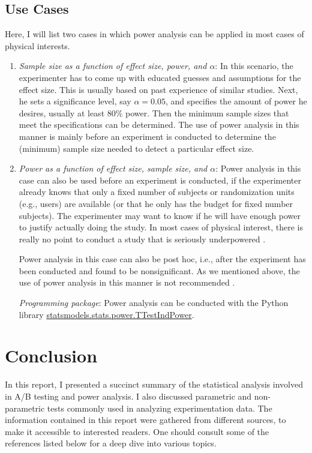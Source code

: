\documentclass[10pt, aps,twocolumn, superscriptaddress, nofootinbib]{revtex4-2}
\begin{document}
\subsection{Use Cases}
Here, I will list two cases in which power analysis can be applied in most cases of physical interests.
 \begin{enumerate}
\item \textit{Sample size as a function of effect size, power, and $\alpha$}: In this scenario, the experimenter has to come up with educated guesses and assumptions for the effect size. This is usually based on past experience of similar studies. Next, he sets a significance level, say $\alpha =0.05$, and specifies the amount of power he desires, usually at least $80\%$ power. Then the minimum sample sizes that meet the specifications can be determined. The use of power analysis in this manner is mainly before an experiment is conducted to determine the (minimum) sample size needed to detect a particular effect size.

\item \textit{Power as a function of effect size, sample size, and $\alpha$}:  Power analysis in this case can also be used before an experiment is conducted,  if the experimenter already knows that only a fixed number of subjects or randomization units (e.g., users) are available (or that he only has the budget for fixed number subjects). The experimenter may want  to know if he will have enough power to justify actually doing the study.  In most cases of physical interest, there is really no point to conduct a study that is seriously underpowered \cite{s11}.

Power analysis in this case can also be post hoc, i.e., after the experiment has been conducted and found to be nonsignificant. As we mentioned above, the use of power analysis in this manner is not recommended \cite{s10}. 

{\it Programming package}:  Power analysis can be conducted with the Python library  \href{https://www.statsmodels.org/stable/generated/statsmodels.stats.power.TTestIndPower.power.html}{statsmodels.stats.power.TTestIndPower}.
\end{enumerate}

\section*{Conclusion}

In this report, I presented a succinct summary of the statistical analysis involved in A/B testing and power analysis. I also discussed parametric and non-parametric tests commonly used in analyzing experimentation data. The information contained in this report were gathered from different sources, to make it accessible to interested readers.  One should consult some of the references listed below for a deep dive into various topics.
\end{document}
